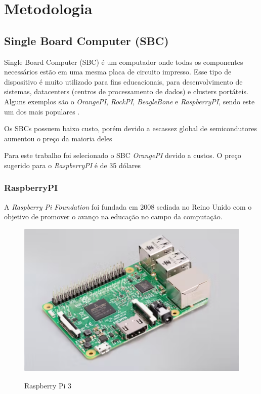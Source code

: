 \section{Metodologia}

\subsection{Single Board Computer (SBC)}

Single Board Computer (SBC) é um computador onde todas os componentes necessários estão em uma mesma placa de circuito impresso. Esse tipo de dispositivo é muito utilizado para fins educacionais, para desenvolvimento de sistemas, datacenters (centros  de  processamento  de  dados) e clusters portáteis. Alguns exemplos são o \textit{OrangePI}, \textit{RockPI}, \textit{BeagleBone} e \textit{RaspberryPI}, sendo este um dos mais populares \cite{SBC_edu}.

Os SBCs possuem baixo custo, porém devido a escassez global de semicondutores aumentou o preço da maioria deles


Para este trabalho foi selecionado o SBC \textit{OrangePI} devido a custos. O preço sugerido para o \textit{RaspberryPI} é de 35 dólares 


\subsubsection{RaspberryPI}

A \textit{Raspberry Pi Foundation} foi fundada em 2008 sediada no Reino Unido com o objetivo de promover o avanço na educação no campo da computação. \cite{rasp}

\begin{figure}[!htbp]
  \caption{Raspberry Pi 3}
  \includegraphics[scale=0.5]{images/rasp.png}
  \label{figura:rasp}
\end{figure}


